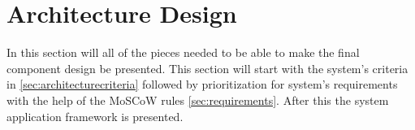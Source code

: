 \section{Architecture Design} \label{sec:architecturedesign}
In this section will all of the pieces needed to be able to make the final component design be presented.
This section will start with the system's criteria in \cref{sec:architecturecriteria} followed by prioritization for system's requirements with the help of the MoSCoW rules \cref{sec:requirements}.
After this the system application framework is presented.



%

